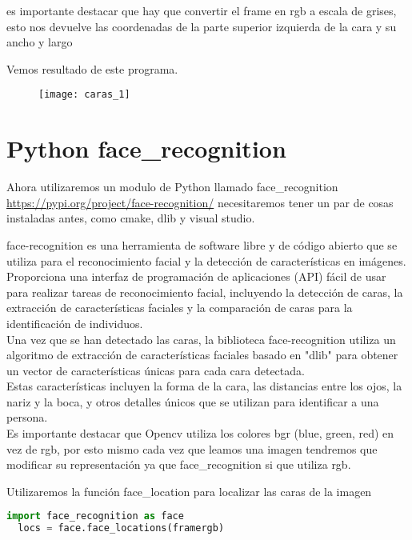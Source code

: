 es importante destacar que hay que convertir el frame en rgb a escala de grises,
esto nos devuelve las coordenadas de la parte superior izquierda de la cara y su 
ancho y largo

Vemos resultado de este programa.\\
\begin{figure}[H]
  \centering
  \texttt{[image: caras\_1]}
  \caption{}\label{fig:ejemplo_característica}
\end{figure}


\section{Python face\_recognition}

Ahora utilizaremos un modulo de Python llamado face\_recognition
\url{https://pypi.org/project/face-recognition/}
necesitaremos tener un par de cosas instaladas antes, como cmake, dlib y visual studio.

face-recognition es una herramienta de software libre y de código abierto
que se utiliza para el reconocimiento facial y la detección de características en imágenes.\\

Proporciona una interfaz de programación de aplicaciones (API) fácil de usar
para realizar tareas de reconocimiento facial, incluyendo la detección de caras,
la extracción de características faciales y la comparación de caras para
la identificación de individuos.\\

Una vez que se han detectado las caras, la biblioteca face-recognition
utiliza un algoritmo de extracción de características faciales basado en 
"dlib" para obtener un vector de características únicas para cada cara detectada.\\
Estas características incluyen la forma de la cara, las distancias entre los ojos,
la nariz y la boca, y otros detalles únicos que se utilizan para identificar a una persona.\\

Es importante destacar que Opencv utiliza los colores bgr (blue, green, red)
en vez de rgb, por esto mismo cada vez que leamos una imagen tendremos que modificar 
su representación ya que face\_recognition si que utiliza rgb.

Utilizaremos la función face\_location para localizar las caras de la imagen
\begin{lstlisting}[language=Python]
  import face_recognition as face
  locs = face.face_locations(framergb)
\end{lstlisting}

